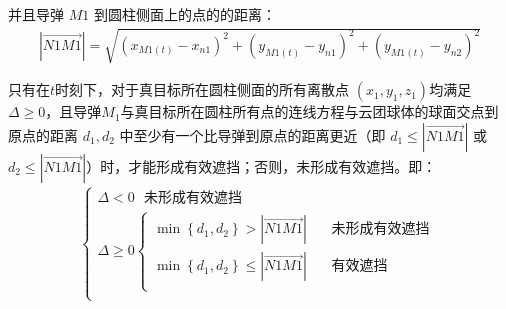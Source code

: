 \documentclass[../main.tex]{subfiles}
\begin{document}
并且导弹 \( M1 \) 到圆柱侧面上的点的的距离：
\begin{align}\label{1.18}
	\left| \overrightarrow{N1M1} \right|=\sqrt{\left( x_{M1(t)}-x_{n1} \right) ^2+\left( y_{M1(t)}-y_{n1} \right) ^2+\left( y_{M1(t)}-y_{n2} \right) ^2}
\end{align}
\par 只有在$t$时刻下，对于真目标所在圆柱侧面的所有离散点 \( (x_1, y_1, z_1) \)均满足 \( \Delta \geq 0 \)，且导弹$M_1$与真目标所在圆柱所有点的连线方程与云团球体的球面交点到原点的距离 \( d_1, d_2 \) 中至少有一个比导弹到原点的距离更近（即 \( d_1 \leq \left| \overrightarrow{N1M1} \right| \) 或 \( d_2 \leq \left| \overrightarrow{N1M1} \right| \)）时，才能形成有效遮挡；否则，未形成有效遮挡。即：
\begin{align}\label{1.19}
	\left\{ \begin{array}{l}
	\varDelta <0\ \ \ \text{未形成有效遮挡}\\
	\varDelta \ge 0\left\{ \begin{array}{l}
	\min \left\{ d_1,d_2 \right\} >\left| \overrightarrow{N1M1} \right|\ \ \ \ \ \ \ \ \text{未形成有效遮挡}\\
	\min \left\{ d_1,d_2 \right\} \le \left| \overrightarrow{N1M1} \right|\ \ \ \ \ \ \ \ \text{有效遮挡}\\
\end{array} \right.\\
\end{array} \right. 
\end{align}
\end{document}
